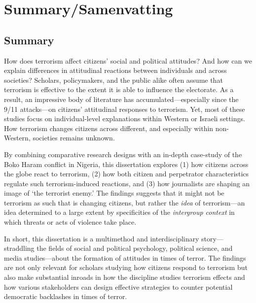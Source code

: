 
\chapter*{Summary/Samenvatting}

\section*{Summary}
 
How does terrorism affect citizens' social and political attitudes? And how can we explain differences in attitudinal reactions between individuals and across societies? Scholars, policymakers, and the public alike often assume that terrorism is effective to the extent it is able to influence the electorate. As a result, an impressive body of literature has accumulated—especially since the 9/11 attacks—on citizens' attitudinal responses to terrorism. Yet, most of these studies focus on individual-level explanations within Western or Israeli settings. How terrorism changes citizens across different, and especially within non-Western, societies remains unknown.

By combining comparative research designs with an in-depth case-study of the Boko Haram conflict in Nigeria, this dissertation explores (1) how citizens across the globe react to terrorism, (2) how both citizen and perpetrator characteristics regulate such terrorism-induced reactions, and (3) how journalists are shaping an image of `the terrorist enemy.' The findings suggests that it might not be terrorism as such that is changing citizens, but rather the \textit{idea} of terrorism---an idea determined to a large extent by specificities of the \textit{intergroup context} in which threats or acts of violence take place. 


In short, this dissertation is a multimethod and interdisciplinary story—straddling the fields of social and political psychology, political science, and media studies—about the formation of attitudes in times of terror. The findings are not only relevant for scholars studying how citizens respond to terrorism but also make substantial inroads in how the discipline studies terrorism effects and how various stakeholders can design effective strategies to counter potential democratic backlashes in times of terror.



\clearpage


\shipout\null   %


